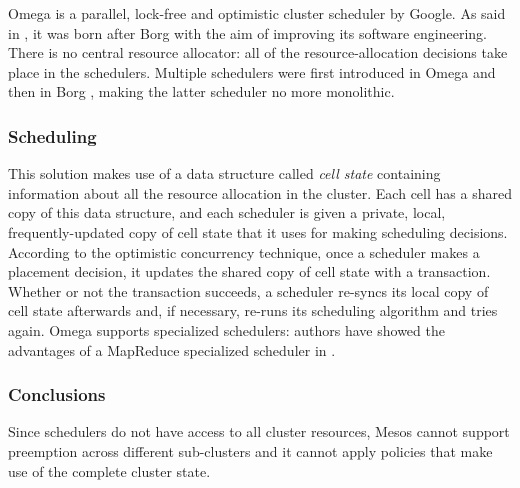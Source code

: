 Omega \cite{omega} is a parallel, lock-free and optimistic cluster scheduler by Google.
As said in \cite{borgomegakubernetes}, it was born after Borg \cite{borg} with the aim of improving its software engineering.
There is no central resource allocator: all of the resource-allocation decisions take place in the schedulers.
Multiple schedulers were first introduced in Omega \cite{omega} and then in Borg \cite{borg}, making the latter scheduler no more monolithic.

\subsubsection{Scheduling}
This solution makes use of a data structure called \textit{cell state} containing information about all the resource allocation in the cluster.
Each cell has a shared copy of this data structure, and each scheduler is given a private, local, frequently-updated copy of cell state that it uses for making scheduling decisions.
According to the optimistic concurrency technique, once a scheduler makes a placement decision, it updates the shared copy of cell state with a transaction.
Whether or not the transaction succeeds, a scheduler re-syncs its local copy of cell state afterwards and, if necessary, re-runs its scheduling algorithm and tries again.
Omega \cite{omega} supports specialized schedulers: authors have showed the advantages of a MapReduce \cite{mapreduce} specialized scheduler in \cite{omega}.

\subsubsection{Conclusions}
Since schedulers do not have access to all cluster resources, Mesos \cite{mesos} cannot support preemption across different sub-clusters and it cannot apply policies that make use of the complete cluster state.

